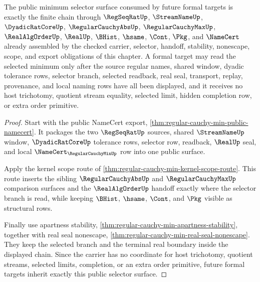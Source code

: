 \begin{theorem}
\label{thm:regular-cauchy-min-formal-target-handoff}
The public minimum selector surface consumed by future formal targets is exactly the finite chain through $\RegSeqRatUp$, $\StreamNameUp$, $\DyadicRatCoreUp$, $\RegularCauchyAbsUp$, $\RegularCauchyMaxUp$, $\RealAlgOrderUp$, $\RealUp$, $\BHist$, $\hsame$, $\Cont$, $\Pkg$, and $\NameCert$ already assembled by the checked carrier, selector, handoff, stability, nonescape, scope, and export obligations of this chapter. A formal target may read the selected minimum only after the source regular names, shared window, dyadic tolerance rows, selector branch, selected readback, real seal, transport, replay, provenance, and local naming rows have all been displayed, and it receives no host trichotomy, quotient stream equality, selected limit, hidden completion row, or extra order primitive.
\end{theorem}
\begin{proof}
Start with the public NameCert export, \autoref{thm:regular-cauchy-min-public-namecert}. It packages the two $\RegSeqRatUp$ sources, shared $\StreamNameUp$ window, $\DyadicRatCoreUp$ tolerance rows, selector row, readback, $\RealUp$ seal, and local $\NameCert_{\RegularCauchyMinUp}$ row into one public surface.

Apply the kernel scope route of \autoref{thm:regular-cauchy-min-kernel-scope-route}. This route inserts the sibling $\RegularCauchyAbsUp$ and $\RegularCauchyMaxUp$ comparison surfaces and the $\RealAlgOrderUp$ handoff exactly where the selector branch is read, while keeping $\BHist$, $\hsame$, $\Cont$, and $\Pkg$ visible as structural rows.

Finally use apartness stability, \autoref{thm:regular-cauchy-min-apartness-stability}, together with real seal nonescape, \autoref{thm:regular-cauchy-min-real-seal-nonescape}. They keep the selected branch and the terminal real boundary inside the displayed chain. Since the carrier has no coordinate for host trichotomy, quotient streams, selected limits, completion, or an extra order primitive, future formal targets inherit exactly this public selector surface.
\end{proof}


